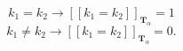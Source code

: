 $$k_1 = k_2 \rightarrow [\![k_1 = k_2]\!]_{\mathbf{T}_{\alpha}} = 1$$
$$k_1 \neq k_2 \rightarrow [\![k_1 = k_2]\!]_{\mathbf{T}_{\alpha}} = 0.$$
